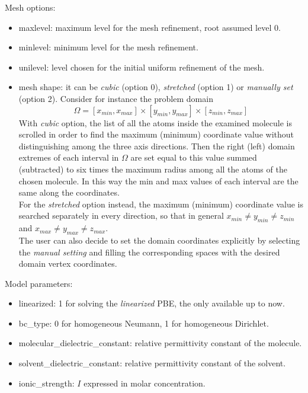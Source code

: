 \documentclass[11pt,a4paper]{article}
\begin{document}
Mesh options:
\begin{itemize}
    \item maxlevel: maximum level for the mesh refinement, root assumed level 0. 
    \item minlevel: minimum level for the mesh refinement.
    \item unilevel: level chosen for the initial uniform refinement of the mesh.
    \item mesh shape: it can be \emph{cubic} (option 0), \emph{stretched} (option 1) or \emph{manually set} (option 2). Consider for instance the problem domain
    \begin{equation*}
        \Omega = [x_{min}, x_{max}] \times [y_{min}, y_{max}] \times [z_{min}, z_{max}]
    \end{equation*}
    With \emph{cubic} option, the list of all the atoms inside the examined molecule is scrolled in order to find the maximum (minimum) coordinate value without distinguishing among the three axis directions. Then the right (left) domain extremes of each interval in $\Omega$ are set equal to this value summed (subtracted) to six times the maximum radius among all the atoms of the chosen molecule. In this way the min and max values of each interval are the same along the coordinates. \\
    For the \emph{stretched} option instead, the maximum (minimum) coordinate value is searched separately in every direction, so that in general $x_{min} \neq y_{min} \neq z_{min}$ and $x_{max} \neq y_{max} \neq z_{max}$. \\
    The user can also decide to set the domain coordinates explicitly by selecting the \emph{manual setting} and filling the corresponding spaces with the desired domain vertex coordinates. 
\end{itemize}
\bigskip
Model parameters:
\begin{itemize}
    \item linearized: 1 for solving the \emph{linearized} PBE, the only available up to now.
    \item bc\_type: 0 for homogeneous Neumann, 1 for homogeneous Dirichlet.
    \item molecular\_dielectric\_constant: relative permittivity constant of the molecule.
    \item solvent\_dielectric\_constant: relative permittivity constant of the solvent.
    \item ionic\_strength: $I$ expressed in molar concentration. 
\end{itemize} 
\end{document}
